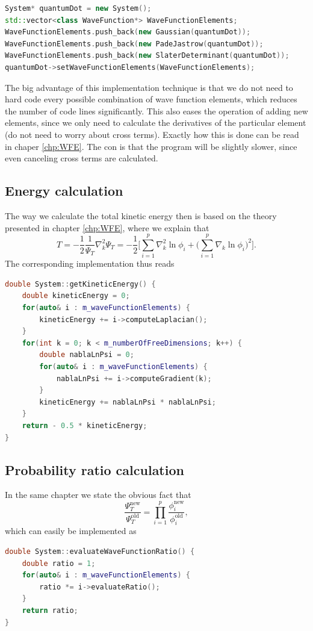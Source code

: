 \lstset{basicstyle=\scriptsize}
\begin{lstlisting}[language=c++,caption={from \texttt{main.cpp}}]
System* quantumDot = new System();
std::vector<class WaveFunction*> WaveFunctionElements;
WaveFunctionElements.push_back(new Gaussian(quantumDot));
WaveFunctionElements.push_back(new PadeJastrow(quantumDot));
WaveFunctionElements.push_back(new SlaterDeterminant(quantumDot));
quantumDot->setWaveFunctionElements(WaveFunctionElements);
\end{lstlisting}

The big advantage of this implementation technique is that we do not need to hard code every possible combination of wave function elements, which reduces the number of code lines significantly. This also eases the operation of adding new elements, since we only need to calculate the derivatives of the particular element (do not need to worry about cross terms). Exactly how this is done can be read in chaper \ref{chp:WFE}. The con is that the program will be slightly slower, since even canceling cross terms are calculated.

\subsection{Energy calculation}
The way we calculate the total kinetic energy then is based on the theory presented in chapter \ref{chp:WFE}, where we explain that
\begin{equation}
T=-\frac{1}{2}\frac{1}{\Psi_T}\nabla_k^2\Psi_T=-\frac{1}{2}\bigg[\sum_{i=1}^p\nabla_k^2\ln\phi_i + \Big(\sum_{i=1}^p\nabla_k\ln\phi_i\Big)^2\bigg].
\end{equation}
The corresponding implementation thus reads
\lstset{basicstyle=\scriptsize}
\begin{lstlisting}[language=c++,caption={from \texttt{system.cpp}}]
double System::getKineticEnergy() {
    double kineticEnergy = 0;
    for(auto& i : m_waveFunctionElements) {
        kineticEnergy += i->computeLaplacian();
    }
    for(int k = 0; k < m_numberOfFreeDimensions; k++) {
        double nablaLnPsi = 0;
        for(auto& i : m_waveFunctionElements) {
            nablaLnPsi += i->computeGradient(k);
        }
        kineticEnergy += nablaLnPsi * nablaLnPsi;
    }
    return - 0.5 * kineticEnergy;
}
\end{lstlisting}

\subsection{Probability ratio calculation}
In the same chapter we state the obvious fact that 
\begin{equation*}
	\frac{\Psi_T^{\text{new}}}{\Psi_T^{\text{old}}}=\prod_{i=1}^p\frac{\phi_i^{\text{new}}}{\phi_i^{\text{old}}},
\end{equation*}
which can easily be implemented as
\lstset{basicstyle=\scriptsize}
\begin{lstlisting}[language=c++,caption={from \texttt{system.cpp}}]
double System::evaluateWaveFunctionRatio() {
    double ratio = 1;
    for(auto& i : m_waveFunctionElements) {
        ratio *= i->evaluateRatio();
    }
    return ratio;
}
\end{lstlisting}

